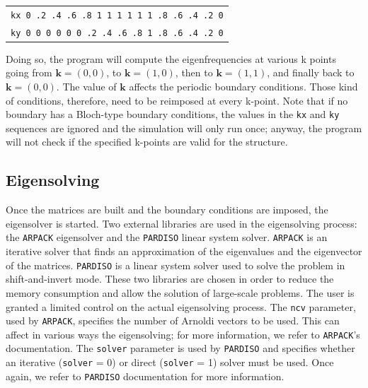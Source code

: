 \documentclass[11pt,a4paper,oneside]{article}
\begin{document}
  \begin{tabular}{l}
{\tt kx 0 .2 .4 .6 .8 1 1 1 1 1 1 .8 .6 .4 .2 0} \\
{\tt ky 0  0  0  0  0  0 .2 .4 .6 .8 1 .8 .6 .4 .2 0} \\
  \end{tabular}

Doing so, the program will compute the eigenfrequencies at various k points going from $\boldsymbol{k} = (0,0)$, to $\boldsymbol{k} = (1,0)$, then to $\boldsymbol{k} = (1,1)$, and finally back to $\boldsymbol{k} = (0,0)$.
The value of $\boldsymbol{k}$ affects the periodic boundary conditions. Those kind of conditions, therefore, need to be reimposed at every k-point. Note that if no boundary has a Bloch-type boundary conditions, the values in the {\tt kx} and {\tt ky} sequences are ignored and the simulation will only run once; anyway, the program will not check if the specified k-points are valid for the structure.

\subsection{Eigensolving}
Once the matrices are built and the boundary conditions are imposed, the eigensolver is started. Two external libraries are used in the eigensolving process: the {\tt ARPACK} eigensolver and the {\tt PARDISO} linear system solver. {\tt ARPACK} is an iterative solver that finds an approximation of the eigenvalues and the eigenvector of the matrices. {\tt PARDISO} is a linear system solver used to solve the problem in shift-and-invert mode. These two libraries are chosen in order to reduce the memory consumption and allow the solution of large-scale problems. The user is granted a limited control on the actual eigensolving process. The {\tt ncv} parameter, used by {\tt ARPACK}, specifies the number of Arnoldi vectors to be used. This can affect in various ways the eigensolving; for more information, we refer to {\tt ARPACK}'s documentation. The {\tt solver} parameter is used by {\tt PARDISO} and specifies whether an iterative ({\tt solver} = 0) or direct ({\tt solver} = 1) solver must be used. Once again, we refer to {\tt PARDISO} documentation for more information.
\end{document}
